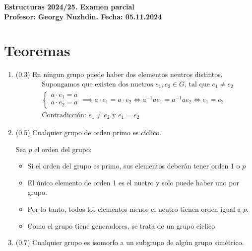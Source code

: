 \documentclass[a4paper,12pt]{article}
\begin{document}
\begin{center}
    \textbf{\Large Estructuras 2024/25. Examen parcial} \\
    \textbf{Profesor: Georgy Nuzhdin. Fecha: 05.11.2024} \\
\end{center}

\section*{Teoremas}
\begin{enumerate}
    \item (0.3) En níngun grupo puede haber dos elementos neutros distintos.
    \begin{equation*}
       \begin{split}
            & \text{Supongamos que existen dos nuetros } e_1, e_2 \in G \text{, tal que } e_{1} \neq e_{2}\\
            & \begin{cases}
                a \cdot e_{1} = a\\
                a \cdot e_{2} = a
            \end{cases} \implies a \cdot e_{1} = a \cdot e_{2} \iff a^{-1}ae_{1} = a^{-1}ae_{2} \iff e_{1} = e_{2}\\
            & \text{Contradicción: } e_{1} \neq e_{2} \text{ y } e_{1} = e_{2}
       \end{split} 
    \end{equation*}

    \item (0.5) Cualquier grupo de orden primo es cíclico.
    
    Sea $p$ el orden del grupo:
    \begin{itemize}
        \item Si el orden del grupo es primo, sus elementos deberán tener orden 1 o $p$
        \item El único elemento de orden 1 es el nuetro y solo puede haber uno por grupo.
        \item Por lo tanto, todos los elementos menos el neutro tienen orden igual a $p$.
        \item Como el grupo tiene generadores, se trata de un grupo cíclico
    \end{itemize}

    \pagebreak

    \item (0.7) Cualquier grupo es isomorfo a un subgrupo de algún grupo simétrico.


\end{enumerate}
\end{document}
